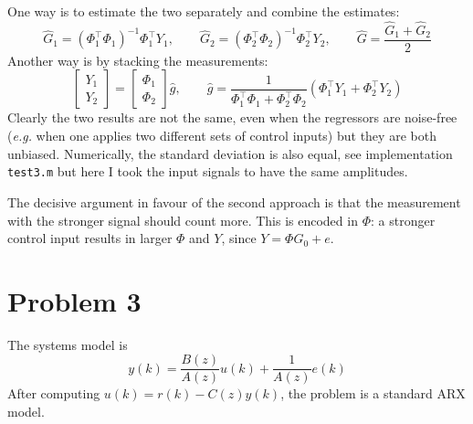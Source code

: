 \documentclass[11pt]{article}
\begin{document}
One way is to estimate the two separately and combine the estimates:
\begin{equation*}
  \hat{G}_1 = (\Phi_1^\top \Phi_1)^{-1}\Phi_1^\top Y_1,\hspace{2em} \hat{G}_2 = (\Phi_2^\top \Phi_2)^{-1}\Phi_2^\top Y_2, \hspace{2em}\hat{G} = \frac{\hat{G}_1 + \hat{G}_2}{2}
\end{equation*}
Another way is by stacking the measurements:
\begin{equation*}
  \begin{bmatrix}
    Y_1 \\ Y_2
  \end{bmatrix} =
  \begin{bmatrix}
    \Phi_1 \\ \Phi_2
  \end{bmatrix}\hat{g},\hspace{2em} \hat{g} = \frac{1}{\Phi_1^\top \Phi_1 + \Phi_2^\top \Phi_2}(\Phi_1^\top Y_1 + \Phi_2^\top Y_2)
\end{equation*}
Clearly the two results are not the same, even when the regressors are noise-free (\textit{e.g.} when one applies two different sets of control inputs) but they are both unbiased. Numerically, the standard deviation is also equal, see implementation \texttt{test3.m} but here I took the input signals to have the same amplitudes.

The decisive argument in favour of the second approach is that the measurement with the stronger signal should count more. This is encoded in $\Phi$: a stronger control input results in larger $\Phi$ and $Y$, since $Y = \Phi G_0 + e$.


\section*{Problem 3}
\label{sec:prob3}

The systems model is
\begin{equation*}
  y(k) = \frac{B(z)}{A(z)}u(k) + \frac{1}{A(z)}e(k)
\end{equation*}
After computing $u(k)=r(k)-C(z)y(k)$, the problem is a standard ARX model.
\end{document}
